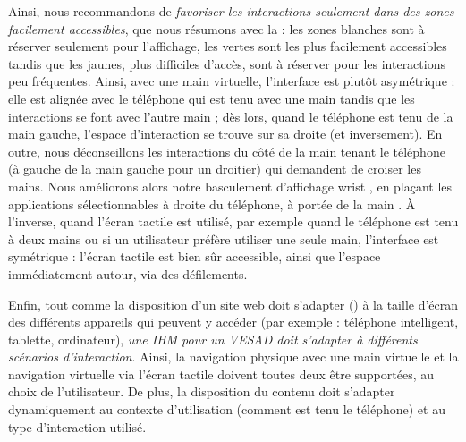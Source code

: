 

Ainsi, nous recommandons de \emph{favoriser les interactions seulement dans des zones facilement accessibles}, que nous résumons avec la  : les zones blanches sont à réserver seulement pour l'affichage, les vertes sont les plus facilement accessibles tandis que les jaunes, plus difficiles d'accès, sont à réserver pour les interactions peu fréquentes. Ainsi, avec une main virtuelle, l'interface est plutôt asymétrique  : elle est alignée avec le téléphone qui est tenu avec une main tandis que les interactions se font avec l'autre main ; dès lors, quand le téléphone est tenu de la main gauche, l'espace d'interaction se trouve sur sa droite (et inversement). En outre, nous déconseillons les interactions du côté de la main tenant le téléphone (à gauche de la main gauche pour un droitier) qui demandent de croiser les mains. Nous améliorons alors notre basculement d'affichage wrist , en plaçant les applications sélectionnables à droite du téléphone, à portée de la main . À l'inverse, quand l'écran tactile est utilisé, par exemple quand le téléphone est tenu à deux mains ou si un utilisateur préfère utiliser une seule main, l'interface est symétrique  : l'écran tactile est bien sûr accessible, ainsi que l'espace immédiatement autour, via des défilements.


Enfin, tout comme la disposition d'un site web doit s'adapter () à la taille d'écran des différents appareils qui peuvent y accéder (par exemple : téléphone intelligent, tablette, ordinateur), \emph{une IHM pour un VESAD doit s'adapter à différents scénarios d'interaction}. Ainsi, la navigation physique avec une main virtuelle et la navigation virtuelle via l'écran tactile doivent toutes deux être supportées, au choix de l'utilisateur. De plus, la disposition du contenu doit s'adapter dynamiquement au contexte d'utilisation (comment est tenu le téléphone) et au type d'interaction utilisé.


